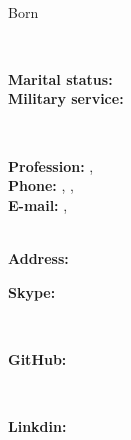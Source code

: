 \documentclass{./../lib/curriculumVitae}
\begin{document}
\iftoggle{Dev}{\par}{}
\noindent\parbox{56mm}
{\parbox{56mm}{\centering\Huge\bfseries\color{cyan}\fullName}\\\parbox{56mm}{\centering Born \bornData}}\parbox{2mm}{\ }\parbox{40mm}
{\textbf{Marital status:} \maritalStatus\\\textbf{Military service:} \militaryService}\parbox{2mm}{\ }\parbox{90mm}
{\textbf{Profession:} \ProfessionI, \ProfessionII\\\textbf{Phone:} \mobilePhoneI, \mobilePhoneII, \phoneNumber\\\textbf{E-mail:} \emailI, \emailII}\\
\textbf{Address:} \fullAddress\\
\parbox{46mm}{\textbf{Skype:} \skype}\parbox{2mm}{\ }\parbox{66mm}{\textbf{GitHub:} \gitHub}\parbox{2mm}{\ }\parbox{74mm}{\textbf{Linkdin:} \linkedin}

\descriptions

\education

\workExperience

\teaching

\project

\publication

\LicensesCertifications

\honorsAwards

\training

\languageS

\craft

\voluntary
\end{document}
